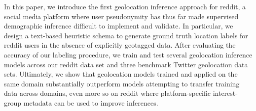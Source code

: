 In this paper, we introduce the first geolocation inference approach for reddit, a social media platform where user pseudonymity has thus far made supervised demographic inference difficult to implement and validate. In particular, we design a text-based heuristic schema to generate ground truth location labels for reddit users in the absence of explicitly geotagged data. After evaluating the accuracy of our labeling procedure, we train and test several geolocation inference models across our reddit data set and three benchmark Twitter geolocation data sets. Ultimately, we show that geolocation models trained and applied on the same domain substantially outperform models attempting to transfer training data across domains, even more so on reddit where platform-specific interest-group metadata can be used to improve inferences.
